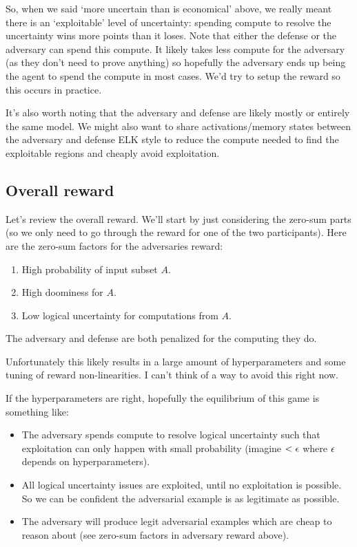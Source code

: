 \documentclass{pset}
\begin{document}
So, when we said `more uncertain than is economical' above, we really meant there is
an `exploitable' level of uncertainty: spending compute to resolve the uncertainty
wins more points than it loses. Note that either the defense or the adversary
can spend this compute. It likely takes less compute for the adversary (as they
don't need to prove anything) so hopefully the adversary ends up being the
agent to spend the compute in most cases. We'd try to setup the reward so
this occurs in practice.

It's also worth noting that the adversary and defense are likely mostly or
entirely the same model. We might also want to share activations/memory states
between the adversary and defense ELK style to reduce the compute needed to
find the exploitable regions and cheaply avoid exploitation.

\subsection{Overall reward}

Let's review the overall reward. We'll start by just considering the zero-sum
parts (so we only need to go through the reward for one of the two
participants).
Here are the zero-sum factors for the adversaries reward:
\begin{enumerate}
  \item High probability of input subset $A$.
  \item High doominess for $A$.
  \item Low logical uncertainty for computations from $A$.
\end{enumerate}

The adversary and defense are both penalized for the computing they do.

Unfortunately this likely results in a large amount of hyperparameters and some
tuning of reward non-linearities. I can't think of a way to avoid this right
now.

If the hyperparameters are right, hopefully the equilibrium of this game is something like:
\begin{itemize}
  \item The adversary spends compute to resolve logical uncertainty such that
    exploitation can only happen with small probability (imagine $< \epsilon$ where
    $\epsilon$ depends on hyperparameters).
  \item All logical uncertainty issues are exploited, until no exploitation is
    possible. So we can be confident the adversarial example is as legitimate
    as possible.
  \item The adversary will produce legit adversarial examples which are cheap to
    reason about (see zero-sum factors in adversary reward above).
\end{itemize}
\end{document}
